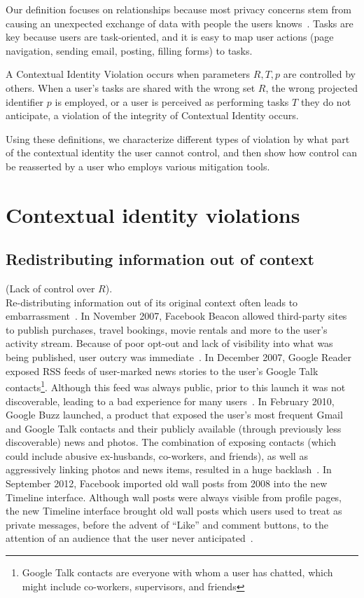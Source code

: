 \documentclass{llncs}
\begin{document}
Our definition focuses on relationships because most privacy concerns stem
from causing an unexpected exchange of data with people the users
knows~\cite{wang}. Tasks are key because users are task-oriented, and it is
easy to map user actions (page navigation, sending email, posting, filling
forms) to tasks.

\begin{definition}
  A Contextual Identity Violation occurs when
parameters $R,T,p$ are controlled by others.  When a user's tasks are shared
with the wrong set $R$, the wrong projected identifier $p$ is employed, or a
user is perceived as performing tasks $T$ they do not anticipate, a
violation of the integrity of Contextual Identity occurs.

\end{definition}

Using these definitions, we characterize different types of violation by what part of the contextual identity the user cannot control, and then show how control can be reasserted by a user who employs various mitigation tools.

\section{Contextual identity violations}
\label{sec:examples}
\subsection{Redistributing information out of context}
(Lack of control over $R$).\\
Re-distributing information out of its original context often leads to
embarrassment~\cite{nissenbaum}.  In November 2007, Facebook Beacon allowed
third-party sites to publish purchases, travel bookings, movie rentals and more to the
user's activity stream.  Because of poor opt-out and lack of visibility into
what was being published, user outcry was immediate~\cite{mccarthy,nakashima}.
In December 2007, Google Reader exposed RSS feeds of user-marked news stories
to the user's Google Talk contacts\footnote{Google Talk contacts are everyone
with whom a user has chatted, which might include co-workers, supervisors, and
friends}. Although this feed was always public, prior to this launch it was not
discoverable, leading to a bad experience for many users~\cite{helft}. In
February 2010, Google Buzz launched, a product that
exposed the user's most frequent Gmail and Google Talk contacts and their
publicly available (through previously less discoverable) news and photos.  The
combination of exposing contacts (which could include abusive ex-husbands,
co-workers, and friends), as well as aggressively linking photos and news
items, resulted in a huge backlash~\cite{fugitivus,buzz}. In September 2012,
Facebook imported old wall posts from 2008 into the new Timeline interface.
Although wall posts were always visible from profile pages, the new Timeline
interface brought old wall posts which users used to treat as private
messages, before the advent of ``Like'' and comment buttons, to the attention
of an audience that the user never anticipated~\cite{timeline}.
\end{document}
